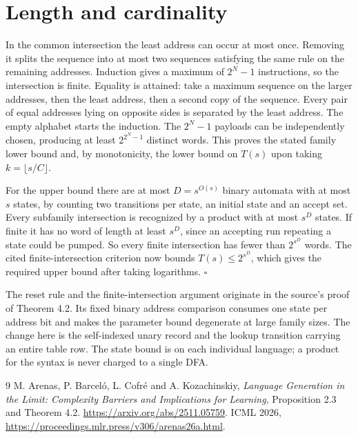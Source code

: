 \documentclass[11pt]{article}
\begin{document}
\section*{Length and cardinality}
In the common intersection the least address can occur at most once. Removing it splits the sequence into at most two sequences satisfying the same rule on the remaining addresses. Induction gives a maximum of $2^N-1$ instructions, so the intersection is finite. Equality is attained: take a maximum sequence on the larger addresses, then the least address, then a second copy of the sequence. Every pair of equal addresses lying on opposite sides is separated by the least address. The empty alphabet starts the induction. The $2^N-1$ payloads can be independently chosen, producing at least $2^{2^N-1}$ distinct words. This proves the stated family lower bound and, by monotonicity, the lower bound on $T(s)$ upon taking $k=\lfloor s/C\rfloor$.

For the upper bound there are at most $D=s^{O(s)}$ binary automata with at most $s$ states, by counting two transitions per state, an initial state and an accept set. Every subfamily intersection is recognized by a product with at most $s^D$ states. If finite it has no word of length at least $s^D$, since an accepting run repeating a state could be pumped. So every finite intersection has fewer than $2^{s^D}$ words. The cited finite-intersection criterion now bounds $T(s)\le 2^{s^D}$, which gives the required upper bound after taking logarithms. \hfill$\square$

The reset rule and the finite-intersection argument originate in the source's proof of Theorem 4.2. Its fixed binary address comparison consumes one state per address bit and makes the parameter bound degenerate at large family sizes. The change here is the self-indexed unary record and the lookup transition carrying an entire table row. The state bound is on each individual language; a product for the syntax is never charged to a single DFA.
\begin{thebibliography}{9}
 M. Arenas, P. Barcel\'o, L. Cofr\'e and A. Kozachinskiy, \emph{Language Generation in the Limit: Complexity Barriers and Implications for Learning}, Proposition 2.3 and Theorem 4.2. \url{https://arxiv.org/abs/2511.05759}. ICML 2026, \url{https://proceedings.mlr.press/v306/arenas26a.html}.
\end{thebibliography}
\end{document}
